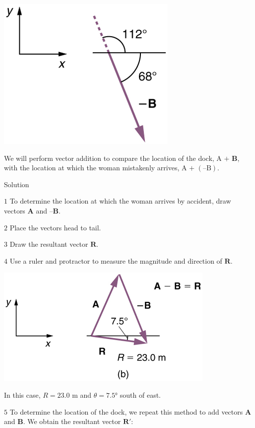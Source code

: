 \documentclass[
]{book}
\newenvironment{tinysection}{}{}
\begin{document}
\includegraphics{images/Figure_03_02_15a.jpg}

We will perform vector addition to compare the location of the dock,
\({\text{A~}\text{+~}\mathbf{B}}{}\), with the location at which the woman
mistakenly arrives, \({\text{A~+~}(\text{–B})}{}\).

\begin{tinysection}

{Solution}

\end{tinysection}

\(1\) To determine the location at which the woman arrives by accident,
draw vectors \(\textbf{A}{}\) and \(\textbf{–B}{}\).

\(2\) Place the vectors head to tail.

\(3\) Draw the resultant vector \(\mathbf{R}{}\).

\(4\) Use a ruler and protractor to measure the magnitude and direction
of \(\mathbf{R}{}\).

\includegraphics{images/Figure_03_02_16a.jpg}

In this case, \({R = \text{23}\text{.}\text{0\ m}}{}\) and
\({{\theta = 7}\text{.}\text{5°}}{}\) south of east.

\(5\) To determine the location of the dock, we repeat this method to
add vectors \(\textbf{A}{}\) and \(\textbf{B}{}\). We obtain the resultant
vector \({\textbf{R}'}{}\):
\end{document}
